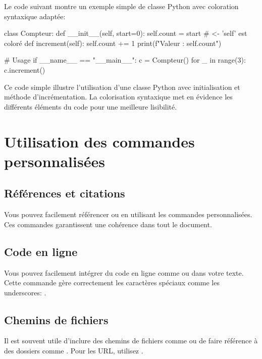 Le code suivant montre un exemple simple de classe Python avec coloration syntaxique adaptée:

\begin{pythoncode}
class Compteur:
    def __init__(self, start=0):
        self.count = start        # <- 'self' est coloré
    def increment(self):
        self.count += 1
        print(f"Valeur : {self.count}")

# Usage
if __name__ == "__main__":
    c = Compteur()
    for _ in range(3):
        c.increment()
\end{pythoncode}

Ce code simple illustre l'utilisation d'une classe Python avec initialisation et méthode d'incrémentation. La colorisation syntaxique met en évidence les différents éléments du code pour une meilleure lisibilité.

\section{Utilisation des commandes personnalisées}

\subsection{Références et citations}

Vous pouvez facilement référencer  ou  en utilisant les commandes personnalisées. Ces commandes garantissent une cohérence dans tout le document.

\subsection{Code en ligne}

Vous pouvez facilement intégrer du code en ligne comme  ou 
 dans votre texte. Cette commande gère correctement les caractères 
spéciaux comme les underscores: .

\subsection{Chemins de fichiers}

Il est souvent utile d'inclure des chemins de fichiers comme  ou 
de faire référence à des dossiers comme . Pour les URL, utilisez
.

